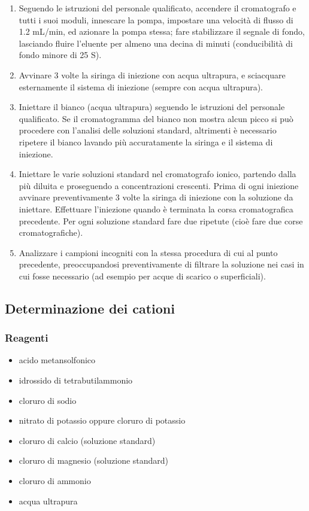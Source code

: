 \begin{enumerate}
\item Seguendo le istruzioni del personale qualificato, accendere il cromatografo e tutti i suoi moduli, innescare la pompa, impostare una velocità di flusso di 1.2 mL/min, ed azionare la pompa stessa; fare stabilizzare il segnale di fondo, lasciando fluire l'eluente per almeno una decina di minuti (conducibilità di fondo minore di 25 \mu S).
\item Avvinare 3 volte la siringa di iniezione con acqua ultrapura, e sciacquare esternamente il sistema di iniezione (sempre con acqua ultrapura).
\item Iniettare il bianco (acqua ultrapura) seguendo le istruzioni del personale qualificato. Se il cromatogramma del bianco non mostra alcun picco si può procedere con l'analisi delle soluzioni standard, altrimenti è necessario ripetere il bianco lavando più accuratamente la siringa e il sistema di iniezione.
\item Iniettare le varie soluzioni standard nel cromatografo ionico, partendo dalla più diluita e proseguendo a concentrazioni crescenti. Prima di ogni iniezione avvinare preventivamente 3 volte la siringa di iniezione con la soluzione da iniettare. Effettuare l'iniezione quando è terminata la corsa cromatografica precedente. Per ogni soluzione standard fare due ripetute (cioè fare due corse cromatografiche).
\item Analizzare i campioni incogniti con la stessa procedura di cui al punto precedente, preoccupandosi preventivamente di filtrare la soluzione nei casi in cui fosse necessario (ad esempio per acque di scarico o superficiali).
\end{enumerate}

\subsection{Determinazione dei cationi}

\subsubsection{Reagenti}

\begin{itemize}
\item acido metansolfonico
\item idrossido di tetrabutilammonio
\item cloruro di sodio
\item nitrato di potassio oppure cloruro di potassio
\item cloruro di calcio (soluzione standard)
\item cloruro di magnesio (soluzione standard)
\item cloruro di ammonio
\item acqua ultrapura
\end{itemize}

